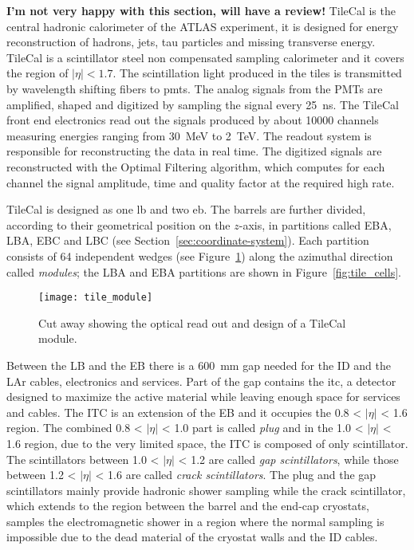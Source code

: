 \textbf{I'm not very happy with this section, will have a review!}
TileCal is the central hadronic calorimeter of the ATLAS experiment, it is
designed for energy reconstruction of hadrons, jets, tau particles and missing
transverse energy. TileCal is a scintillator steel non compensated sampling
calorimeter and it covers the region of $|\eta| < 1.7$. The scintillation light
produced in the tiles is transmitted by wavelength shifting fibers to
\glspl{pmt}. The analog signals from the PMTs are amplified, shaped and
digitized by sampling the signal every 25~ns. The TileCal front end electronics
read out the signals produced by about 10000 channels measuring energies ranging
from 30~MeV to 2~TeV. The readout system is responsible for reconstructing the
data in real time. The digitized signals are reconstructed with the Optimal
Filtering algorithm, which computes for each channel the signal amplitude, time
and quality factor at the required high rate.

TileCal is designed as one \gls{lb} and two \gls{eb}. The barrels are further
divided, according to their geometrical position on the $z$-axis, in partitions
called EBA, LBA, EBC and LBC (see Section~\ref{sec:coordinate-system}). Each
partition consists of 64 independent wedges (see Figure~\ref{fig:tile_mod})
along the azimuthal direction called \emph{modules}; the LBA and EBA partitions
are shown in Figure~\ref{fig:tile_cells}.

\begin{figure}[!h]
  \centering
    \texttt{[image: tile\_module]}
    \caption{Cut away showing the optical read out and design of a TileCal
      module.}
    \label{fig:tile_mod}
\end{figure}

Between the LB and the EB there is a 600~mm gap needed for the ID and the LAr
cables, electronics and services. Part of the gap contains the \gls{itc}, a
detector designed to maximize the active material while leaving enough space for
services and cables. The ITC is an extension of the EB and it occupies the 0.8 <
$|\eta|$ < 1.6 region. The combined 0.8 < $|\eta|$ < 1.0 part is called
\emph{plug} and in the 1.0 < $|\eta|$ < 1.6 region, due to the very limited
space, the ITC is composed of only scintillator. The scintillators between 1.0 <
$|\eta|$ < 1.2 are called \emph{gap scintillators}, while those between 1.2 <
$|\eta|$ < 1.6 are called \emph{crack scintillators}. The plug and the gap
scintillators mainly provide hadronic shower sampling while the crack
scintillator, which extends to the region between the barrel and the end-cap
cryostats, samples the electromagnetic shower in a region where the normal
sampling is impossible due to the dead material of the cryostat walls and the ID
cables.

